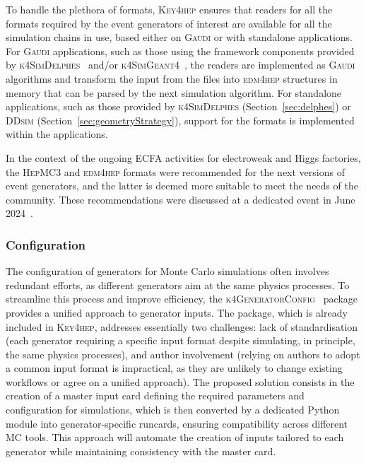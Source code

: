 To handle the plethora of formats, 
\textsc{Key4hep} ensures that readers for all the formats required by the event generators of interest 
are available for all the simulation chains in use, based either on \textsc{Gaudi} or with standalone applications. 
For \textsc{Gaudi} applications, 
such as those using the framework components provided by \textsc{k4SimDelphes}~\cite{k4simdelphes} 
and/or \textsc{k4SimGeant4}~\cite{k4simgeant4}, 
the readers are implemented as \textsc{Gaudi} algorithms 
and transform the input from the files into \textsc{edm4hep} structures in memory 
that can be parsed by the next simulation algorithm. 
For standalone applications, 
such as those provided by \textsc{k4SimDelphes} (Section~\ref{sec:delphes}) or \textsc{DDsim} (Section~\ref{sec:geometryStrategy}), 
support for the formats is implemented within the applications.  

In the context of the ongoing ECFA activities for electroweak and Higgs factories, 
the \textsc{HepMC3} and \textsc{edm4hep} formats were recommended for the next versions of event generators, 
and the latter is deemed more suitable to meet the needs of the community. 
These recommendations were discussed at a dedicated event in June 2024~\cite{mcsupporttoolsevt}.

\subsubsection{Configuration}

The configuration of generators for Monte Carlo simulations often involves redundant efforts, 
as different generators aim at the same physics processes. 
To streamline this process and improve efficiency, 
the \textsc{k4GeneratorConfig}~\cite{GenConfig} package provides a unified approach to generator inputs. 
The package, which is already included in \textsc{Key4hep}, addresses essentially two challenges: 
lack of standardisation 
(each generator requiring a specific input format despite simulating, in principle, the same physics processes), 
and author involvement 
(relying on authors to adopt a common input format is impractical, 
as they are unlikely to change existing workflows or agree on a unified approach).
The proposed solution consists in the creation of a master input card defining the required parameters and configuration for simulations, 
which is then converted by a dedicated Python module into generator-specific runcards, 
ensuring compatibility across different MC tools. 
This approach will automate the creation of inputs tailored to each generator while maintaining consistency with the master card.

